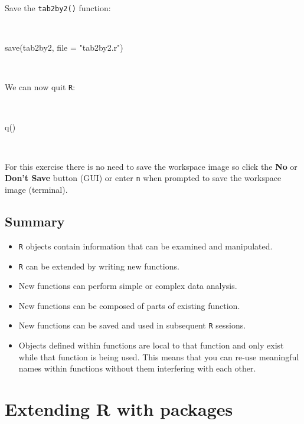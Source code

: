 \documentclass[
  12pt,
]{book}
\newenvironment{Shaded}{\begin{snugshade}}{\end{snugshade}}
\newcommand{\AttributeTok}[1]{\textcolor[rgb]{0.77,0.63,0.00}{#1}}
\newcommand{\FunctionTok}[1]{\textcolor[rgb]{0.00,0.00,0.00}{#1}}
\newcommand{\NormalTok}[1]{#1}
\newcommand{\StringTok}[1]{\textcolor[rgb]{0.31,0.60,0.02}{#1}}
\begin{document}
Save the \texttt{tab2by2()} function:

~

\begin{Shaded}
\begin{Highlighting}[]
\FunctionTok{save}\NormalTok{(tab2by2, }\AttributeTok{file =} \StringTok{"tab2by2.r"}\NormalTok{)}
\end{Highlighting}
\end{Shaded}

~

We can now quit \texttt{R}:

~

\begin{Shaded}
\begin{Highlighting}[]
\FunctionTok{q}\NormalTok{()}
\end{Highlighting}
\end{Shaded}

~

For this exercise there is no need to save the workspace image so click the \textbf{No} or \textbf{Don't Save} button (GUI) or enter \texttt{n} when prompted to save the workspace image (terminal).

\hypertarget{summary-1}{%
\section{Summary}\label{summary-1}}

\begin{itemize}
\item
  \texttt{R} objects contain information that can be examined and manipulated.
\item
  \texttt{R} can be extended by writing new functions.
\item
  New functions can perform simple or complex data analysis.
\item
  New functions can be composed of parts of existing function.
\item
  New functions can be saved and used in subsequent \texttt{R} sessions.
\item
  Objects defined within functions are local to that function and only exist while that function is being used. This means that you can re-use meaningful names within functions without them interfering with each other.
\end{itemize}

\hypertarget{extend-r}{%
\chapter{Extending R with packages}\label{extend-r}}
\end{document}
